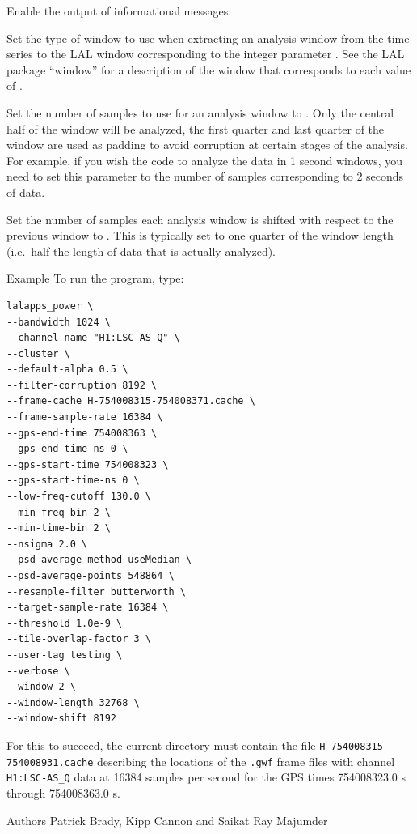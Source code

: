 \begin{entry}
\begin{entry}
\item[\option{--verbose}]
Enable the output of informational messages.

\item[\option{--window} \parm{window}]
Set the type of window to use when extracting an analysis window from the
time series to the LAL window corresponding to the integer parameter
.  See the LAL package ``window'' for a description of the
window that corresponds to each value of .

\item[\option{--window-length} \parm{samples}]
Set the number of samples to use for an analysis window to .
Only the central half of the window will be analyzed, the first quarter and
last quarter of the window are used as padding to avoid corruption at
certain stages of the analysis.  For example, if you wish the code to
analyze the data in 1 second windows, you need to set this parameter to the
number of samples corresponding to 2 seconds of data.

\item[\option{--window-shift} \parm{samples}]
Set the number of samples each analysis window is shifted with respect to
the previous window to .  This is typically set to one
quarter of the window length (i.e.\ half the length of data that is
actually analyzed).

\end{entry}


\item[Example]
To run the program, type:
\begin{verbatim}
lalapps_power \
--bandwidth 1024 \
--channel-name "H1:LSC-AS_Q" \
--cluster \
--default-alpha 0.5 \
--filter-corruption 8192 \
--frame-cache H-754008315-754008371.cache \
--frame-sample-rate 16384 \
--gps-end-time 754008363 \
--gps-end-time-ns 0 \
--gps-start-time 754008323 \
--gps-start-time-ns 0 \
--low-freq-cutoff 130.0 \
--min-freq-bin 2 \
--min-time-bin 2 \
--nsigma 2.0 \
--psd-average-method useMedian \
--psd-average-points 548864 \
--resample-filter butterworth \
--target-sample-rate 16384 \
--threshold 1.0e-9 \
--tile-overlap-factor 3 \
--user-tag testing \
--verbose \
--window 2 \
--window-length 32768 \
--window-shift 8192
\end{verbatim}
For this to succeed, the current directory must contain the file
\texttt{H-754008315-754008931.cache} describing the locations of the
\texttt{.gwf} frame files with channel \verb|H1:LSC-AS_Q| data at 16384
samples per second for the GPS times 754008323.0 s through 754008363.0 s.

\item[Authors]
Patrick Brady,  Kipp Cannon and Saikat Ray Majumder 
\end{entry}
\clearpage

